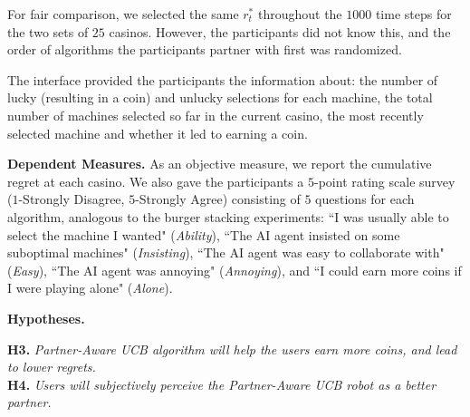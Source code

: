 \documentclass[letterpaper]{article} %
\theoremstyle{definition}
\renewenvironment{quote}
  {\list{}{\rightmargin=0cm \leftmargin=0.25cm}%
   \item\relax}
  {\endlist}
\begin{document}
For fair comparison, we selected the same $r^*_t$ throughout the $1000$ time steps for the two sets of $25$ casinos. However, the participants did not know this, and the order of algorithms the participants partner with first was randomized.


The interface provided the participants the information about: the number of lucky (resulting in a coin) and unlucky selections for each machine, the total number of machines selected so far in the current casino, the most recently selected machine and whether it led to earning a coin.

\smallskip
\noindent\textbf{Dependent Measures.} As an objective measure, we report the cumulative regret at each casino. We also gave the participants a $5$-point rating scale survey ($1$-Strongly Disagree, $5$-Strongly Agree) consisting of $5$ questions for each algorithm, analogous to the burger stacking experiments: ``I was usually able to select the machine I wanted" (\emph{Ability}), ``The AI agent insisted on some suboptimal machines" (\emph{Insisting}), ``The AI agent was easy to collaborate with" (\emph{Easy}), ``The AI agent was annoying" (\emph{Annoying}), and ``I could earn more coins if I were playing alone" (\emph{Alone}).


\clearpage%
\noindent\textbf{Hypotheses.}
\begin{quote}
    \textbf{H3.} \textit{Partner-Aware UCB algorithm will help the users earn more coins, and lead to lower regrets.}\\
    \textbf{H4.} \textit{Users will subjectively perceive the Partner-Aware UCB robot as a better partner.}
\end{quote}
\end{document}
